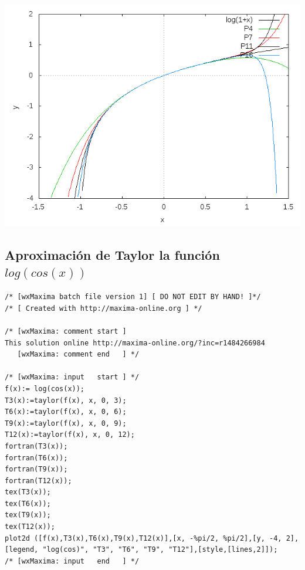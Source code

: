 \documentclass[12pt]{article}
\begin{document}
\includegraphics[scale=.5]{log1+x.png}
\begin{center}

\end{center}
\pagebreak
\subsection{Aproximación de Taylor la función  $log(cos(x))$}

\begin{verbatim}
/* [wxMaxima batch file version 1] [ DO NOT EDIT BY HAND! ]*/
/* [ Created with http://maxima-online.org ] */

/* [wxMaxima: comment start ]
This solution online http://maxima-online.org/?inc=r1484266984
   [wxMaxima: comment end   ] */

/* [wxMaxima: input   start ] */
f(x):= log(cos(x));
T3(x):=taylor(f(x), x, 0, 3);
T6(x):=taylor(f(x), x, 0, 6);
T9(x):=taylor(f(x), x, 0, 9);
T12(x):=taylor(f(x), x, 0, 12);
fortran(T3(x));
fortran(T6(x));
fortran(T9(x));
fortran(T12(x));
tex(T3(x));
tex(T6(x));
tex(T9(x));
tex(T12(x));
plot2d ([f(x),T3(x),T6(x),T9(x),T12(x)],[x, -%pi/2, %pi/2],[y, -4, 2],[legend, "log(cos)", "T3", "T6", "T9", "T12"],[style,[lines,2]]);
/* [wxMaxima: input   end   ] */

\end{verbatim}
\end{document}
